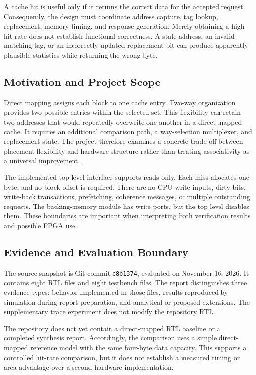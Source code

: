 \documentclass[conference]{IEEEtran}
\begin{document}
A cache hit is useful only if it returns the correct data for the
accepted request. Consequently, the design must coordinate address
capture, tag lookup, replacement, memory timing, and response
generation. Merely obtaining a high hit rate does not establish
functional correctness. A stale address, an invalid matching tag, or an
incorrectly updated replacement bit can produce apparently plausible
statistics while returning the wrong byte.

\subsection{Motivation and Project Scope}

Direct mapping assigns each block to one cache entry. Two-way
organization provides two possible entries within the selected set.
This flexibility can retain two addresses that would repeatedly
overwrite one another in a direct-mapped cache. It requires an
additional comparison path, a way-selection multiplexer, and
replacement state. The project therefore examines a concrete trade-off
between placement flexibility and hardware structure rather than
treating associativity as a universal improvement.

The implemented top-level interface supports reads only. Each miss
allocates one byte, and no block offset is required. There are no CPU
write inputs, dirty bits, write-back transactions, prefetching,
coherence messages, or multiple outstanding requests. The
backing-memory module has write ports, but the top level disables them.
These boundaries are important when interpreting both verification
results and possible FPGA use.

\subsection{Evidence and Evaluation Boundary}

The source snapshot is Git commit \texttt{c8b1374}, evaluated on
November 16, 2026. It contains eight RTL files and eight testbench
files. The report distinguishes three evidence types: behavior
implemented in those files, results reproduced by simulation during
report preparation, and analytical or proposed extensions. The
supplementary trace experiment does not modify the repository RTL.

The repository does not yet contain a direct-mapped RTL baseline or a
completed synthesis report. Accordingly, the comparison uses a simple
direct-mapped reference model with the same four-byte data capacity.
This supports a controlled hit-rate comparison, but it does not
establish a measured timing or area advantage over a second hardware
implementation.
\end{document}
